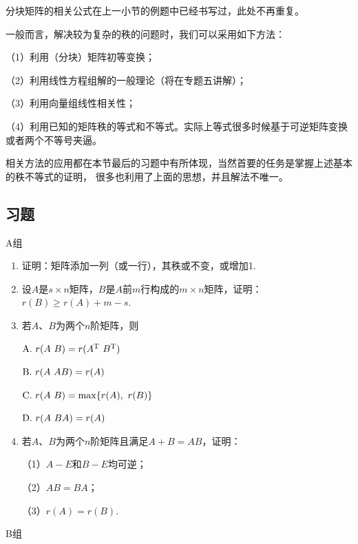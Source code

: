分块矩阵的相关公式在上一小节的例题中已经书写过，此处不再重复。

一般而言，解决较为复杂的秩的问题时，我们可以采用如下方法：

（1）利用（分块）矩阵初等变换；

（2）利用线性方程组解的一般理论（将在专题五讲解）；

（3）利用向量组线性相关性；

（4）利用已知的矩阵秩的等式和不等式。实际上等式很多时候基于可逆矩阵变换或者两个不等号夹逼。

相关方法的应用都在本节最后的习题中有所体现，当然首要的任务是掌握上述基本的秩不等式的证明，
很多也利用了上面的思想，并且解法不唯一。

\subsection{习题}
\centerline{\heiti A组}
\begin{enumerate}
	\item 证明：矩阵添加一列（或一行），其秩或不变，或增加1.
	\item 设$A$是$s \times n$矩阵，$B$是$A$前$m$行构成的$m \times n$矩阵，证明：
	$r(B) \ge r(A) + m - s$.
	\item 若$A$、$B$为两个$n$阶矩阵，则

	$\textup{A}.\ r(A\ B)=r(A^\mathrm{T}\ B^\mathrm{T})$

	$\textup{B}.\ r(A\ AB)=r(A)$

	$\textup{C}.\ r(A\ B)=\max\{r(A),\ r(B)\}$

	$\textup{D}.\ r(A\ BA)=r(A)$
	\item 若$A$、$B$为两个$n$阶矩阵且满足$A+B=AB$，证明：

	（1）$A-E$和$B-E$均可逆；

	（2）$AB=BA$；

	（3）$r(A)=r(B)$.
\end{enumerate}
\centerline{\heiti B组}
